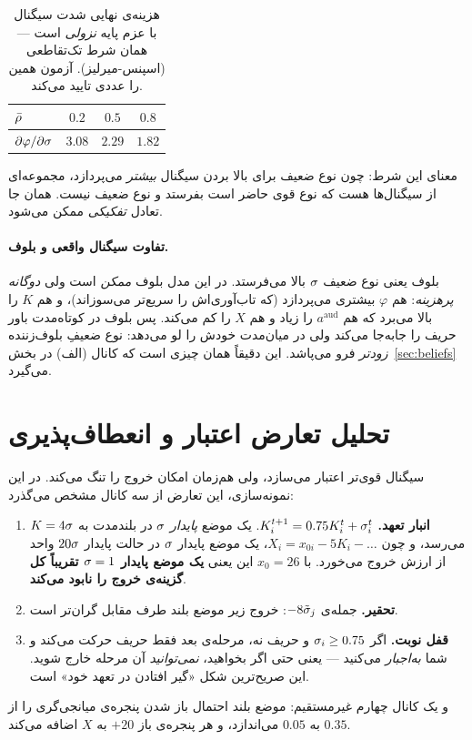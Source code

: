 \documentclass[12pt,a4paper]{article}
\begin{document}
\begin{table}[h]\centering
\begin{tabular}{lccc}
\toprule
$\bar{\rho}$ & $0.2$ & $0.5$ & $0.8$\\
\midrule
$\partial\varphi/\partial\sigma$ & $3.08$ & $2.29$ & $1.82$\\
\bottomrule
\end{tabular}
\caption{هزینه‌ی نهایی شدت سیگنال با عزم پایه \emph{نزولی} است — همان شرط
تک‌تقاطعی (اسپنس-میرلیز). آزمون
همین را عددی تایید می‌کند.}
\end{table}

معنای این شرط: چون نوع ضعیف برای بالا بردن سیگنال \emph{بیشتر} می‌پردازد،
مجموعه‌ای از سیگنال‌ها هست که نوع قوی حاضر است بفرستد و نوع ضعیف نیست. همان
جا تعادل \emph{تفکیکی} ممکن می‌شود.

\paragraph{تفاوت سیگنال واقعی و بلوف.}
بلوف یعنی نوع ضعیف $\sigma$ بالا می‌فرستد. در این مدل بلوف \emph{ممکن} است ولی
\emph{دوگانه پرهزینه}: هم $\varphi$ بیشتری می‌پردازد (که تاب‌آوری‌اش را سریع‌تر
می‌سوزاند)، و هم $K$ را بالا می‌برد که هم $a^{\mathrm{aud}}$ را زیاد و هم
$X$ را کم می‌کند. پس بلوف در کوتاه‌مدت باور حریف را جابه‌جا می‌کند ولی در
میان‌مدت خودش را لو می‌دهد: نوع ضعیفِ بلوف‌زننده \emph{زودتر} فرو می‌پاشد.
این دقیقاً همان چیزی است که کانال (الف) در بخش~\ref{sec:beliefs} می‌گیرد.

\section{تحلیل تعارض اعتبار و انعطاف‌پذیری}\label{sec:credflex}

سیگنال قوی‌تر اعتبار می‌سازد، ولی هم‌زمان امکان خروج را تنگ می‌کند. در این
نمونه‌سازی، این تعارض از سه کانال مشخص می‌گذرد:

\begin{enumerate}[leftmargin=1.6em,itemsep=3pt]
  \item \textbf{انبار تعهد.} $K_i^{t+1}=0.75K_i^t+\sigma_i^t$. یک موضع
        \emph{پایدار} $\sigma$ در بلندمدت به $K=4\sigma$ می‌رسد، و چون
        $X_i=x_{0i}-5K_i-\dots$، یک موضع پایدار $\sigma$ در حالت پایدار
        $20\sigma$ واحد از ارزش خروج می‌خورد. با $x_0=26$ این یعنی
        \textbf{یک موضع پایدار $\sigma=1$ تقریباً کل گزینه‌ی خروج را نابود
        می‌کند}.
  \item \textbf{تحقیر.} جمله‌ی $-8\tilde{\sigma}_j$: خروج زیر موضع بلند طرف
        مقابل گران‌تر است.
  \item \textbf{قفل نوبت.} اگر $\sigma_i\ge0.75$ و حریف نه، مرحله‌ی بعد فقط
        حریف حرکت می‌کند و شما \emph{به‌اجبار}  می‌کنید — یعنی
        حتی اگر بخواهید، \emph{نمی‌توانید} آن مرحله خارج شوید. این
        صریح‌ترین شکل «گیر افتادن در تعهد خود» است.
\end{enumerate}
و یک کانال چهارم غیرمستقیم: موضع بلند احتمال باز شدن پنجره‌ی میانجی‌گری را از
$0.35$ به $0.05$ می‌اندازد، و هر پنجره‌ی باز $+20$ به $X$ اضافه می‌کند.
\end{document}
